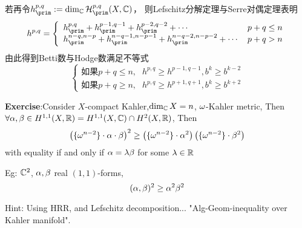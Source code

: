 若再令$h^{p,q}_{\prim}:=\dim_{\bbC}\mcalH^{p,q}_{\prim}(X,\bbC)$，
则Lefschitz分解定理与Serre对偶定理表明
$$
  h^{p,q}
=
  \left\{
    \begin{array}{ll}
      h^{p,q}_{\prim}
     +h^{p-1,q-1}_{\prim}
     +h^{p-2,q-2}_{\prim}+\cdots
    &p+q\leq n
    \\
      h^{n-q,n-p}_{\prim}
     +h^{n-q-1,n-p-1}_{\prim}
     +h^{n-q-2,n-p-2}_{\prim}+\cdots
    &p+q>n
    \end{array}
  \right.
$$
由此得到Betti数与Hodge数满足不等式
$$
  \left\{
    \begin{array}{ll}
      \text{如果$p+q\leq n$,}
     &h^{p,q}\geq h^{p-1,q-1},b^k\geq b^{k-2}\\
       \text{如果$p+q\geq n$,}
     &h^{p,q}\geq h^{p+1,q+1},b^k\geq b^{k+2}
    \end{array}
  \right.
$$


\textbf{Exercise}:Consider $X$-compact Kahler,$\dim_{\mathbb{C}} X=n$, $\omega$-Kahler metric,
Then $\forall\alpha,\beta\in H^{1,1}(X,\mathbb{R})=H^{1,1}(X,\mathbb{C})\cap H^2(X,\mathbb{R})$,
Then
$$
  \left(
    \{\omega^{n-2}\}\cdot\alpha\cdot\beta
  \right)^2
\geq
  \left(
    \{\omega^{n-2}\}\cdot\alpha^2
  \right)
  \left(
    \{\omega^{n-2}\}\cdot\beta^2
  \right)
$$
with equality if and only if $\alpha=\lambda\beta$ for some $\lambda\in \mathbb{R}$

Eg: $\mathbb{C}^2$, $\alpha,\beta$ real $(1,1)$-forms,
$$(\alpha,\beta)^2\geq \alpha^2\beta^2$$

Hint: Using HRR, and Lefschitz decomposition...
"Alg-Geom-inequality over Kahler manifold".


